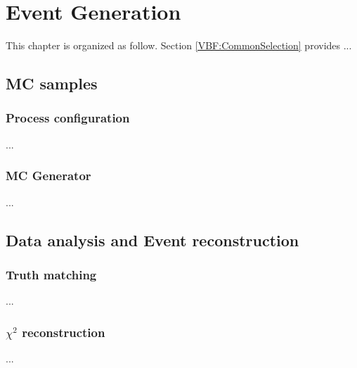 \chapter{Event Generation}\label{section:VBFanalysis}

This chapter is organized as follow. Section \ref{VBF:CommonSelection} provides ...


\section{MC samples}

\subsection{Process configuration}\label{MCsamples}
...

\subsection{MC Generator}
...

\section{Data analysis and Event reconstruction}

\subsection{Truth matching}\label{subsec:data_trigger}
...

\subsection{$\chi^{2}$ reconstruction}

...




